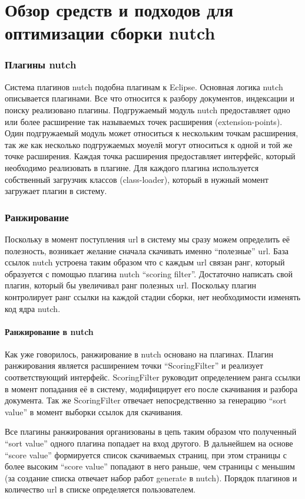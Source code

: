 \chapter{Обзор средств и подходов для оптимизации сборки nutch}
\subsection*{Плагины nutch}
Система плагинов nutch подобна плагинам к Eclipse. Основная логика nutch описывается плагинами. Все что относится к разбору документов, индексации и поиску реализовано плагины. Подгружаемый модуль nutch предоставляет одно или более расширение так называемых точек расширения (extension-points). Один подгружаемый модуль может относиться к нескольким точкам расширения, так же как несколько подгружаемых моуелй могут относиться к одной и той же точке расширения. Каждая точка расширения предоставляет интерфейс, который необходимо реализовать в плагине. Для каждого плагина используется собственный загрузчик классов (class-loader), который в нужный момент загружает плагин в систему.\cite{nutchbib}
\subsection*{Ранжирование}
Поскольку в момент поступления url в систему мы сразу можем определить её полезность, возникает желание сначала скачивать именно ``полезные'' url. База ссылок nutch устроена таким образом что с каждым url связан ранг, который образуется с помощью плагина nutch ``scoring filter''.
Достаточно написать свой плагин, который бы увеличивал ранг полезных url. Поскольку плагин контролирует ранг ссылки на каждой стадии сборки, нет необходимости изменять код ядра nutch.

\subsubsection*{Ранжирование в nutch}
Как уже говорилось, ранжирование в nutch основано на плагинах. Плагин ранжирования является расширением точки ``ScoringFilter'' и реализует соответствующий интерфейс. ScoringFilter руководит определением ранга ссылки в момент попадания её в систему, модифицирует его после скачивания и разбора документа. Так же ScoringFilter отвечает непосредственно за генерацию ``sort value'' в момент выборки ссылок для скачивания.

Все плагины ранжирования организованы в цепь таким образом что полученный ``sort value'' одного плагина попадает на вход другого. В дальнейшем на основе ``score value'' формируется список скачиваемых страниц, при этом страницы с более высоким ``score value'' попадают в него раньше, чем страницы с меньшим (за создание списка отвечает набор работ generate в nutch). Порядок плагинов и количество url в списке определяется пользователем.\cite{nutchscore}

